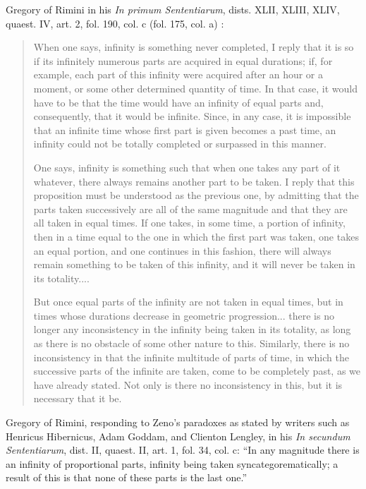 \documentclass{amsart}
\theoremstyle{definition}
\begin{document}
Gregory of Rimini in his {\em In primum Sententiarum}, dists. XLII, XLIII, XLIV, quaest. IV, art. 2, fol. 190, col. c (fol. 175, col. a) \cite[pp.~115--116]{ariew}:
\begin{quote}
When one says, infinity is something never completed, I reply that it is so if its infinitely numerous parts are acquired in equal durations; if, for example, each part of this
infinity were acquired after an hour or a moment, or some other determined quantity of time. In that case, it would have to be that the time would have an infinity of equal parts and,
consequently, that it would be infinite. Since, in any case, it is impossible that an infinite time whose first part is given becomes a past time, an infinity could
not be totally completed or surpassed in this manner.

One says, infinity is something such that when one takes any part of it whatever, there always remains another part to be taken. I reply that this proposition
must be understood as the previous one, by admitting that the parts taken successively are all of the same magnitude and that they are all taken in equal times. If one takes, in some time, a portion of infinity, then in a time equal to the one in which the first part was taken, one takes an equal portion, and one continues in this fashion, there will always remain something
to be taken of this infinity, and it will never be taken in its totality....

But once equal parts of the infinity are not taken in equal times, but in times whose durations decrease in geometric progression... there is no longer any inconsistency in the
infinity being taken in its totality, as long as there is no obstacle of some other nature to this. Similarly, there is no inconsistency in that the infinite multitude of parts of time, in which
the successive parts of the infinite are taken, come to be completely past, as we have already stated. Not only is there no inconsistency in this, but it is necessary that it be.
\end{quote}

Gregory of Rimini, responding to Zeno's paradoxes as stated by writers such as Henricus Hibernicus, Adam Goddam, and Clienton Lengley, in his
{\em In secundum Sententiarum}, dist. II, quaest. II, art. 1, fol. 34, col. c:\cite[p.~57]{ariew} ``In any magnitude there is an infinity of proportional parts, infinity
being taken syncategorematically; a result of this is that none of these parts is the last one.''
\end{document}

